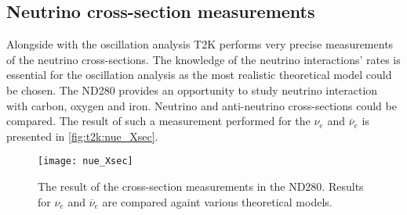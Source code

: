 \documentclass[../main.tex]{subfiles}
\begin{document}
\subsection{Neutrino cross-section measurements}
Alongside with the oscillation analysis T2K performs very precise measurements of the neutrino cross-sections. The knowledge of the neutrino interactions' rates is essential for the oscillation analysis as the most realistic theoretical model could be chosen. The ND280 provides an opportunity to study neutrino interaction with carbon, oxygen and iron. Neutrino and anti-neutrino cross-sections could be compared. The result of such a measurement performed for the $\nu_e$ and $\overline{\nu}_e$ is presented in \autoref{fig:t2k:nue_Xsec}.

\begin{figure}[!ht]
  \centering
  \texttt{[image: nue\_Xsec]}
  \caption{The result of the cross-section measurements in the ND280. Results for $\nu_e$ and $\overline{\nu}_e$ are compared againt various theoretical models.}
  \label{fig:t2k:nue_Xsec}
\end{figure}
\end{document}
